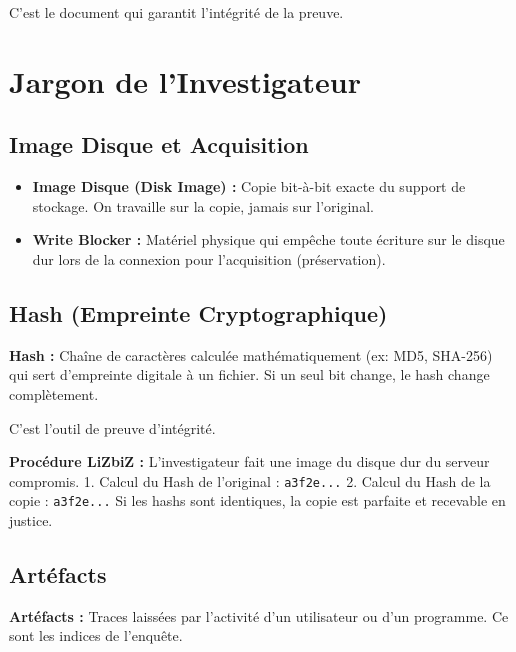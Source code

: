 C'est le document qui garantit l'intégrité de la preuve.

\section{Jargon de l'Investigateur}

\subsection{Image Disque et Acquisition}

\begin{itemize}
    \item \textbf{Image Disque (Disk Image) :} Copie bit-à-bit exacte du support de stockage. On travaille sur la copie, jamais sur l'original.
    \item \textbf{Write Blocker :} Matériel physique qui empêche toute écriture sur le disque dur lors de la connexion pour l'acquisition (préservation).
\end{itemize}

\subsection{Hash (Empreinte Cryptographique)}

\begin{boxdef}
\textbf{Hash :} Chaîne de caractères calculée mathématiquement (ex: MD5, SHA-256) qui sert d'empreinte digitale à un fichier. Si un seul bit change, le hash change complètement.
\end{boxdef}

C'est l'outil de preuve d'intégrité.

\begin{boxlizbiz}
\textbf{Procédure LiZbiZ :}
L'investigateur fait une image du disque dur du serveur compromis.
1. Calcul du Hash de l'original : \texttt{a3f2e...}
2. Calcul du Hash de la copie : \texttt{a3f2e...}
Si les hashs sont identiques, la copie est parfaite et recevable en justice.
\end{boxlizbiz}

\subsection{Artéfacts}

\begin{boxdef}
\textbf{Artéfacts :} Traces laissées par l'activité d'un utilisateur ou d'un programme. Ce sont les indices de l'enquête.
\end{boxdef}

